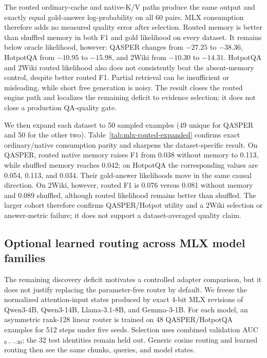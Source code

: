 \documentclass[10pt]{article}
\begin{document}
The routed ordinary-cache and native-K/V paths produce the same output and
exactly equal gold-answer log-probability on all 60 pairs. MLX consumption
therefore adds no measured quality error after selection. Routed memory is
better than shuffled memory in both F1 and gold likelihood on every dataset.
It remains below oracle likelihood, however: QASPER changes from $-27.25$ to
$-38.36$, HotpotQA from $-10.95$ to $-15.98$, and 2Wiki from $-10.30$ to
$-14.31$. HotpotQA and 2Wiki routed likelihood also does not consistently beat
the absent-memory control, despite better routed F1. Partial retrieval can be
insufficient or misleading, while short free generation is noisy. The result
closes the routed engine path and localizes the remaining deficit to evidence
selection; it does not close a production QA-quality gate.

We then expand each dataset to 50 sampled examples (49 unique for QASPER and
50 for the other two). Table~\ref{tab:mlx-routed-expanded} confirms exact
ordinary/native consumption parity and sharpens the dataset-specific result.
On QASPER, routed native memory raises F1 from 0.038 without memory to 0.113,
while shuffled memory reaches 0.042; on HotpotQA the corresponding values are
0.054, 0.113, and 0.034. Their gold-answer likelihoods move in the same causal
direction. On 2Wiki, however, routed F1 is 0.076 versus 0.081 without memory
and 0.089 shuffled, although routed likelihood remains better than shuffled.
The larger cohort therefore confirms QASPER/Hotpot utility and a 2Wiki
selection or answer-metric failure; it does not support a dataset-averaged
quality claim.

\begin{table}[!htbp]
\centering
\scriptsize
\caption{Expanded routed QA. Selection is frozen before ordinary or native
consumption; oracle and shuffled conditions are causal bounds.}
\resizebox{\linewidth}{!}{%
}
\label{tab:mlx-routed-expanded}
\end{table}

\subsection{Optional learned routing across MLX model families}

The remaining discovery deficit motivates a controlled adapter comparison, but
it does not justify replacing the parameter-free router by default. We freeze
the normalized attention-input states produced by exact 4-bit MLX revisions of
Qwen3-4B, Qwen3-14B, Llama-3.1-8B, and Gemma-3-1B. For each model, an asymmetric
rank-128 linear router is trained on 48 QASPER/HotpotQA examples for 512 steps
under five seeds. Selection uses combined validation AUC$_{0--30}$; the 32 test
identities remain held out. Generic cosine routing and learned routing then see
the same chunks, queries, and model states.
\end{document}
